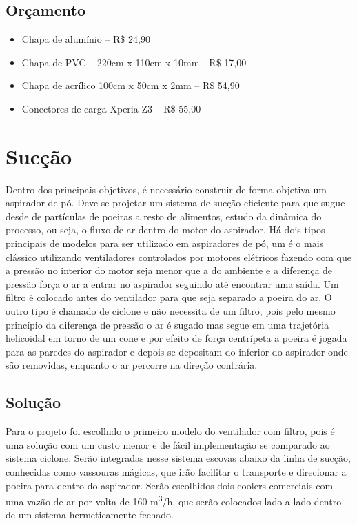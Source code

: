 	\subsection{Orçamento} %
	\label{sub:orçamento}
		
		\begin{itemize}
			\item Chapa de alumínio – R\$ 24,90 
			\item Chapa de PVC – 220cm x 110cm x 10mm - R\$ 17,00
			\item Chapa de acrílico 100cm x 50cm x 2mm – R\$ 54,90
			\item Conectores de carga Xperia Z3 – R\$ 55,00
		\end{itemize}	


\section{Sucção} %
\label{sub:aspirador}
	
	Dentro dos principais objetivos, é necessário construir de forma objetiva um aspirador de pó. Deve-se projetar um sistema de sucção eficiente para que sugue desde de partículas de poeiras a resto de alimentos, estudo da dinâmica do processo, ou seja, o fluxo de ar dentro do motor do aspirador. Há dois tipos principais de modelos para ser utilizado em aspiradores de pó, um é o mais clássico utilizando ventiladores controlados por motores elétricos fazendo com que a pressão no interior do motor seja menor que a do ambiente e a diferença de pressão força o ar a entrar no aspirador seguindo até encontrar uma saída. Um filtro é colocado antes do ventilador para que seja separado a poeira do ar. O outro tipo é chamado de ciclone e não necessita de um filtro, pois pelo mesmo princípio da diferença de pressão o ar é sugado mas segue em uma trajetória helicoidal em torno de um cone e por efeito de força centrípeta a poeira é jogada para as paredes do aspirador e depois se depositam do inferior do aspirador onde são removidas, enquanto o ar percorre na direção contrária.

	\subsection{Solução} %
	\label{sub:solução}
		
		Para o projeto foi escolhido o primeiro modelo do ventilador com filtro, pois  é uma solução com um custo menor e de fácil implementação se comparado ao sistema ciclone. Serão integradas nesse sistema escovas abaixo da linha de sucção, conhecidas como vassouras mágicas, que irão facilitar o transporte e direcionar a poeira para dentro do aspirador. Serão escolhidos dois coolers comerciais com uma vazão de ar por volta de 160 m\textsuperscript{3}/h, que serão colocados lado a lado dentro de um sistema hermeticamente fechado.

